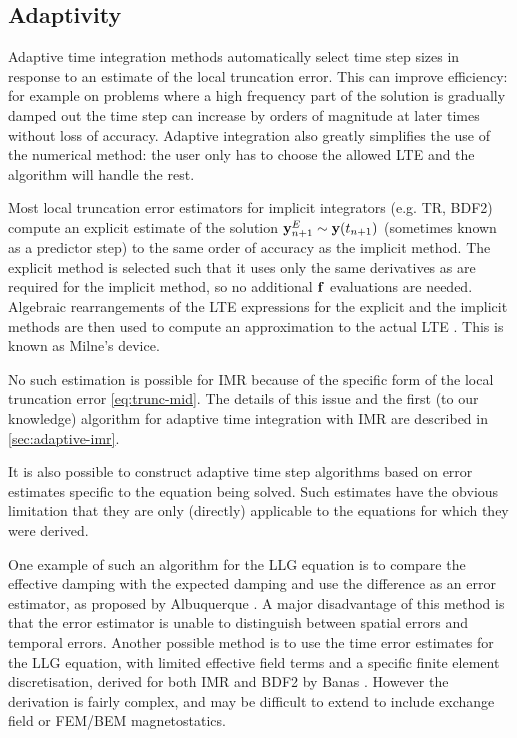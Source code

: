 \subsection{Adaptivity}
\label{sec:adaptivity}

Adaptive time integration methods automatically select time step sizes in response to an estimate of the local truncation error.
This can improve efficiency: for example on problems where a high frequency part of the solution is gradually damped out the time step can increase by orders of magnitude at later times without loss of accuracy.
Adaptive integration also greatly simplifies the use of the numerical method: the user only has to choose the allowed LTE and the algorithm will handle the rest.

Most local truncation error estimators for implicit integrators (e.g. TR, BDF2) compute an explicit estimate of the solution $\boldsymbol{\mathrm{y}}^E_{n+1} \sim \boldsymbol{\mathrm{y}}(t_{n+1})$ (sometimes known as a predictor step) to the same order of accuracy as the implicit method.
The explicit method is selected such that it uses only the same derivatives as are required for the implicit method, so no additional ${\boldsymbol{\mathrm{f}}}$ evaluations are needed.
Algebraic rearrangements of the LTE expressions for the explicit and the implicit methods are then used to compute an approximation to the actual LTE \cite[707-716]{GreshoSani}.
This is known as Milne's device.

No such estimation is possible for IMR because of the specific form of the local truncation error \eqref{eq:trunc-mid}.
The details of this issue and the first (to our knowledge) algorithm for adaptive time integration with IMR are described in \cref{sec:adaptive-imr}.

It is also possible to construct adaptive time step algorithms based on error estimates specific to the equation being solved.
Such estimates have the obvious limitation that they are only (directly) applicable to the equations for which they were derived.

One example of such an algorithm for the LLG equation is to compare the effective damping with the expected damping and use the difference as an error estimator, as proposed by Albuquerque \etal \cite{Albuquerque2001}.
A major disadvantage of this method is that the error estimator is unable to distinguish between spatial errors and temporal errors.
Another possible method is to use the time error estimates for the LLG equation, with limited effective field terms and a specific finite element discretisation, derived for both IMR and BDF2 by Banas \cite{Banas-thesis}.
However the derivation is fairly complex, and may be difficult to extend to include exchange field or FEM/BEM magnetostatics.


